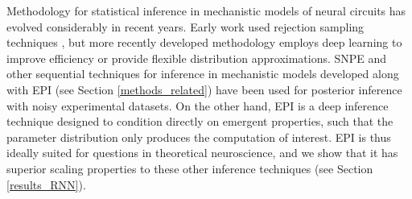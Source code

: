 \documentclass[11pt]{article}
\begin{document}
Methodology for statistical inference in mechanistic models of neural circuits has evolved considerably in recent years.
Early work used rejection sampling techniques \cite{beaumont2002approximate, marjoram2003markov,sisson2007sequential}, but more recently developed methodology employs deep learning to improve efficiency or provide flexible distribution approximations.
SNPE \cite{gonccalves2019training} and other sequential techniques for inference in mechanistic models developed along with EPI (see Section \ref{methods_related}) have been used for posterior inference with noisy experimental datasets.
On the other hand, EPI is a deep inference technique designed to condition directly on emergent properties, such that the parameter distribution only produces the computation of interest.
EPI is thus ideally suited for questions in theoretical neuroscience, and we show that it has superior scaling properties to these other inference techniques (see Section \ref{results_RNN}).
\end{document}

